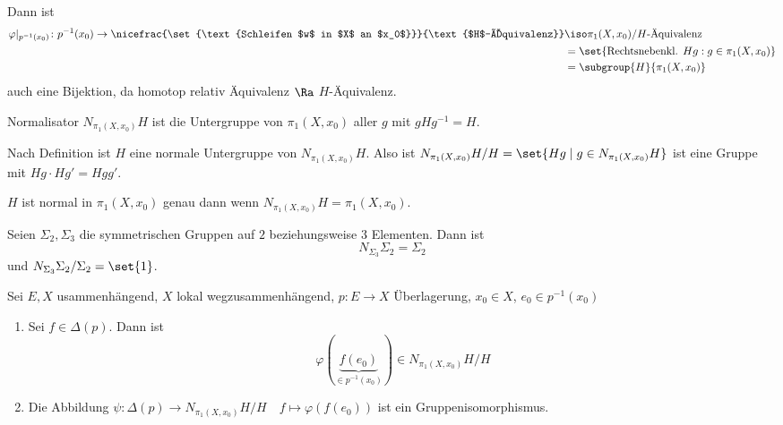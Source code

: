 \documentclass[language=ngerman]{TemplateLecture} %
\begin{document}
Dann ist
\[\begin{split}
    \varphi\rvert_{p^{-1}(x_0)} \colon p^{-1}(x_0) \to \nicefrac{\set{\text{Schleifen $w$ in $X$ an $x_0$}}}{\text{$H$-Äquivalenz}} &\iso \pi_1(X, x_0)/H\text{-Äquivalenz} \\
    &= \set{\text{Rechtsnebenkl. } Hg : g \in \pi_1(X, x_0)} \\
    &= \subgroup{H}{\pi_1(X, x_0)}
\end{split}\]
auch eine Bijektion, da homotop relativ Äquivalenz \(\Ra\) \(H\)-Äquivalenz.

\begin{defi}{Normalisator}{}
    \(N_{\pi_1(X,x_0)}H\) ist die Untergruppe von \(\pi_1(X, x_0)\) aller \(g\) mit \(g H g^{-1} = H\).
\end{defi}

Nach Definition ist \(H\) eine normale Untergruppe von \(N_{\pi_1(X,x_0)}H\). Also ist \(N_{\pi_1(X,x_0)}H/H = \set{Hg \mid g \in N_{\pi_1(X,x_0)}H}\)
ist eine Gruppe mit \(Hg \cdot Hg' = Hg g'\).

\begin{example}
    \(H\) ist normal in \(\pi_1(X,x_0)\) genau dann wenn \(N_{\pi_1(X,x_0)}H = \pi_1(X,x_0)\).

    Seien \(\Sigma_2, \Sigma_3\) die symmetrischen Gruppen auf \(2\) beziehungsweise \(3\) Elementen. Dann ist
    \[N_{\Sigma_3}\Sigma_2 = \Sigma_2\]
    und \(N_{\Sigma_3}\Sigma_2/\Sigma_2 = \set{1}\).
\end{example}

\begin{thm}{}{}
    Sei \(E, X\) usammenhängend, \(X\) lokal wegzusammenhängend, \(p \colon E\to X\) Überlagerung, \(x_0 \in X\), \(e_0 \in p^{-1}(x_0)\)
    \begin{enumerate}
        \item Sei \(f \in \Delta(p)\). Dann ist
        \[\varphi(\underbrace{f(e_0)}_{\in p^{-1}(x_0)}) \in N_{\pi_1(X, x_0)}H/H\]
        \item Die Abbildung \(\psi \colon \Delta(p) \to N_{\pi_1(X,x_0)}H/H \quad f \mapsto \varphi(f(e_0))\) ist ein Gruppenisomorphismus.
    \end{enumerate}
\end{thm}
\end{document}
